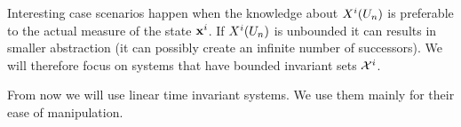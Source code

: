 Interesting case scenarios happen when the knowledge about $X^i(U_n)$ is preferable to the actual measure of the state $ \mathbf{x}^i$.
If $X^i(U_n)$ is unbounded it can results in smaller abstraction (it can possibly create an infinite number of successors).
We will therefore focus on systems that have bounded invariant sets ${\mathcal{X}^i}$.

From now we will use linear time invariant systems. We use them mainly for their ease of manipulation.
